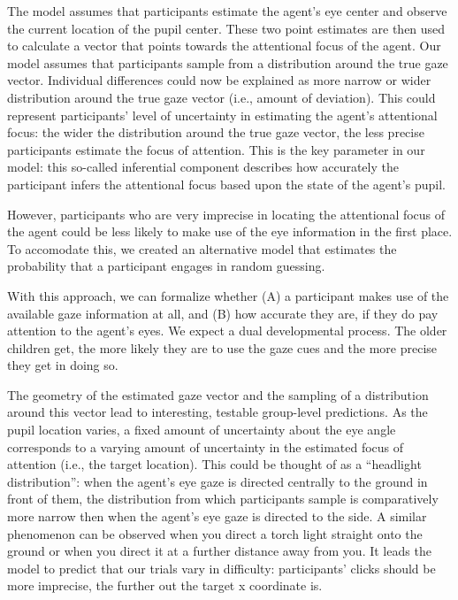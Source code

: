\documentclass[
  man,floatsintext]{apa6}
\begin{document}
The model assumes that participants estimate the agent's eye center and observe the current location of the pupil center.
These two point estimates are then used to calculate a vector that points towards the attentional focus of the agent.
Our model assumes that participants sample from a distribution around the true gaze vector.
Individual differences could now be explained as more narrow or wider distribution around the true gaze vector (i.e., amount of deviation).
This could represent participants' level of uncertainty in estimating the agent's attentional focus: the wider the distribution around the true gaze vector, the less precise participants estimate the focus of attention.
This is the key parameter in our model: this so-called inferential component describes how accurately the participant infers the attentional focus based upon the state of the agent's pupil.

However, participants who are very imprecise in locating the attentional focus of the agent could be less likely to make use of the eye information in the first place.
To accomodate this, we created an alternative model that estimates the probability that a participant engages in random guessing.

With this approach, we can formalize whether (A) a participant makes use of the available gaze information at all, and (B) how accurate they are, if they do pay attention to the agent's eyes.
We expect a dual developmental process.
The older children get, the more likely they are to use the gaze cues and the more precise they get in doing so.

The geometry of the estimated gaze vector and the sampling of a distribution around this vector lead to interesting, testable group-level predictions.
As the pupil location varies, a fixed amount of uncertainty about the eye angle corresponds to a varying amount of uncertainty in the estimated focus of attention (i.e., the target location).
This could be thought of as a ``headlight distribution'': when the agent's eye gaze is directed centrally to the ground in front of them, the distribution from which participants sample is comparatively more narrow then when the agent's eye gaze is directed to the side.
A similar phenomenon can be observed when you direct a torch light straight onto the ground or when you direct it at a further distance away from you.
It leads the model to predict that our trials vary in difficulty: participants' clicks should be more imprecise, the further out the target x coordinate is.
\end{document}
